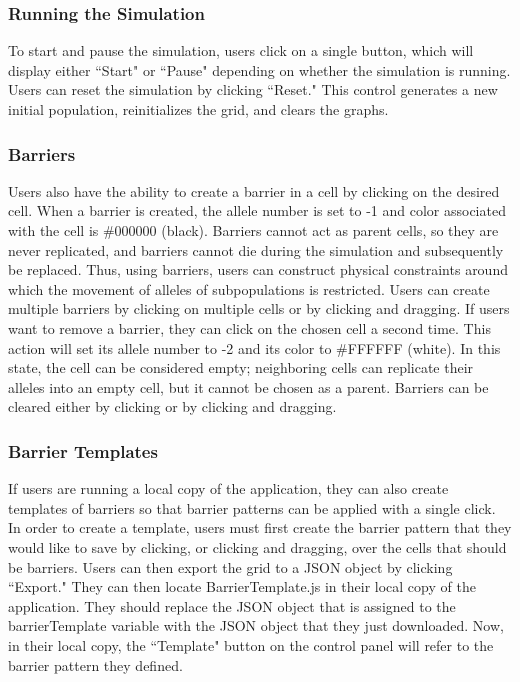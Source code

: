 \documentclass[12pt]{article}
\begin{document}
\begin{spacing}{1.6}
\subsubsection{Running the Simulation}
To start and pause the simulation, users click on a single button, which will display either ``Start" or ``Pause" depending on whether the simulation is running. Users can reset the simulation by clicking ``Reset." This control generates a new initial population, reinitializes the grid, and clears the graphs.

\subsubsection{Barriers}
Users also have the ability to create a barrier in a cell by clicking on the desired cell. When a barrier is created, the allele number is set to -1 and color associated with the cell is \#000000 (black). Barriers cannot act as parent cells, so they are never replicated, and barriers cannot die during the simulation and subsequently be replaced. Thus, using barriers, users can construct physical constraints around which the movement of alleles of subpopulations is restricted. Users can create multiple barriers by clicking on multiple cells or by clicking and dragging. If users want to remove a barrier, they can click on the chosen cell a second time. This action will set its allele number to -2 and its color to \#FFFFFF (white). In this state, the cell can be considered empty; neighboring cells can replicate their alleles into an empty cell, but it cannot be chosen as a parent. Barriers can be cleared either by clicking or by clicking and dragging.

\subsubsection{Barrier Templates}
If users are running a local copy of the application, they can also create templates of barriers so that barrier patterns can be applied with a single click. In order to create a template, users must first create the barrier pattern that they would like to save by clicking, or clicking and dragging, over the cells that should be barriers. Users can then export the grid to a JSON object by clicking ``Export." They can then locate BarrierTemplate.js in their local copy of the application. They should replace the JSON object that is assigned to the barrierTemplate variable with the JSON object that they just downloaded. Now, in their local copy, the ``Template" button on the control panel will refer to the barrier pattern they defined.


\end{spacing}
\end{document}
